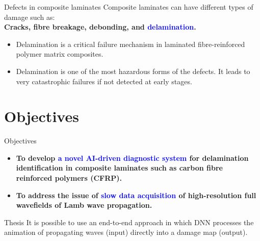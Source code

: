 \documentclass[10pt,aspectratio=169]{beamer} %
\begin{document}
\begin{frame}{Defects in composite laminates}
	\small
	Composite laminates can have different types of damage such as: \\
	\textbf{Cracks, fibre breakage, debonding, and \textcolor{blue}{delamination}.} \\ 
	\begin{minipage}[c]{.40\textwidth}
		\begin{itemize}
			\footnotesize
			\item Delamination is a critical failure mechanism in laminated fibre-reinforced polymer matrix composites.
			\item Delamination is one of the most hazardous forms of the defects. 
			It leads to very catastrophic failures if not detected at early stages.
		\end{itemize}
	\end{minipage}
	\hfill
	\begin{minipage}[c]{0.50\textwidth}
	\end{minipage}
\end{frame}

\section{Objectives}
\begin{frame}{Objectives}
	\begin{itemize}
		\item \textbf{To develop \textcolor{blue}{a novel AI-driven diagnostic system} for delamination identification in composite laminates such as carbon fibre reinforced polymers (CFRP).}
		\item \textbf{To address the issue of \textcolor{blue}{slow data acquisition} of high-resolution full wavefields of Lamb wave propagation.}
	\end{itemize}
	\begin{alertblock}{Thesis}
		It is possible to use an end-to-end approach in which DNN 
		processes the animation of propagating waves (input) directly into a damage map (output).
	\end{alertblock}
\end{frame}
\end{document}
